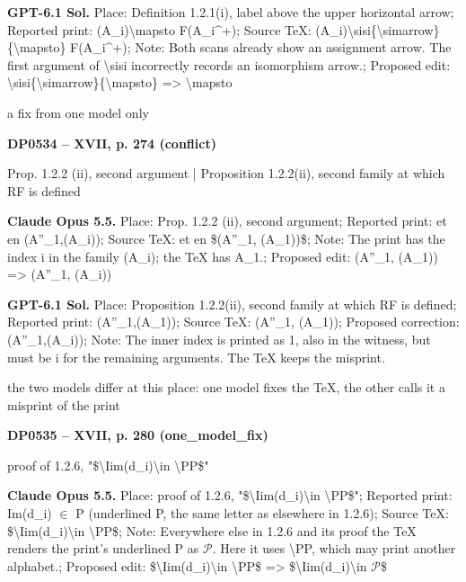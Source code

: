 \textbf{GPT-6.1 Sol.} Place: Definition 1.2.1(i), label above the upper horizontal arrow; Reported print: (A\_i)\textbackslash{}mapsto F(A\_i\textasciicircum{}+); Source TeX: (A\_i)\textbackslash{}sisi\{\textbackslash{}simarrow\}\{\textbackslash{}mapsto\} F(A\_i\textasciicircum{}+); Note: Both scans already show an assignment arrow. The first argument of \textbackslash{}sisi incorrectly records an isomorphism arrow.; Proposed edit: \textbackslash{}sisi\{\textbackslash{}simarrow\}\{\textbackslash{}mapsto\} =\allowbreak > \textbackslash{}mapsto\par
a fix from one model only\par
\par\noindent\hypertarget{DP0534}{}\textbf{DP0534 -- XVII, p. 274 (conflict)}\par
Prop. 1.2.2 (ii), second argument | Proposition 1.2.2(ii), second family at which RF is defined\par
\textbf{Claude Opus 5.5.} Place: Prop. 1.2.2 (ii), second argument; Reported print: et en (A''\_1,(A\_i)); Source TeX: et en \$(A''\_1, (A\_1))\$; Note: The print has the index i in the family (A\_i); the TeX has A\_1.; Proposed edit: (A''\_1, (A\_1)) =\allowbreak > (A''\_1, (A\_i))\par
\textbf{GPT-6.1 Sol.} Place: Proposition 1.2.2(ii), second family at which RF is defined; Reported print: (A''\_1,(A\_1)); Source TeX: (A''\_1, (A\_1)); Proposed correction: (A''\_1,(A\_i)); Note: The inner index is printed as 1, also in the witness, but must be i for the remaining arguments. The TeX keeps the misprint.\par
the two models differ at this place: one model fixes the TeX, the other calls it a misprint of the print\par
\par\noindent\hypertarget{DP0535}{}\textbf{DP0535 -- XVII, p. 280 (one\_model\_fix)}\par
proof of 1.2.6, "\$\textbackslash{}Iim(d\_i)\textbackslash{}in \textbackslash{}PP\$"\par
\textbf{Claude Opus 5.5.} Place: proof of 1.2.6, "\$\textbackslash{}Iim(d\_i)\textbackslash{}in \textbackslash{}PP\$"; Reported print: Im(d\_i) \ensuremath{\in} P (underlined P, the same letter as elsewhere in 1.2.6); Source TeX: \$\textbackslash{}Iim(d\_i)\textbackslash{}in \textbackslash{}PP\$; Note: Everywhere else in 1.2.6 and its proof the TeX renders the print's underlined P as \ensuremath{𝒫}. Here it uses \textbackslash{}PP, which may print another alphabet.; Proposed edit: \$\textbackslash{}Iim(d\_i)\textbackslash{}in \textbackslash{}PP\$ =\allowbreak > \$\textbackslash{}Iim(d\_i)\textbackslash{}in \ensuremath{𝒫}\$\par
